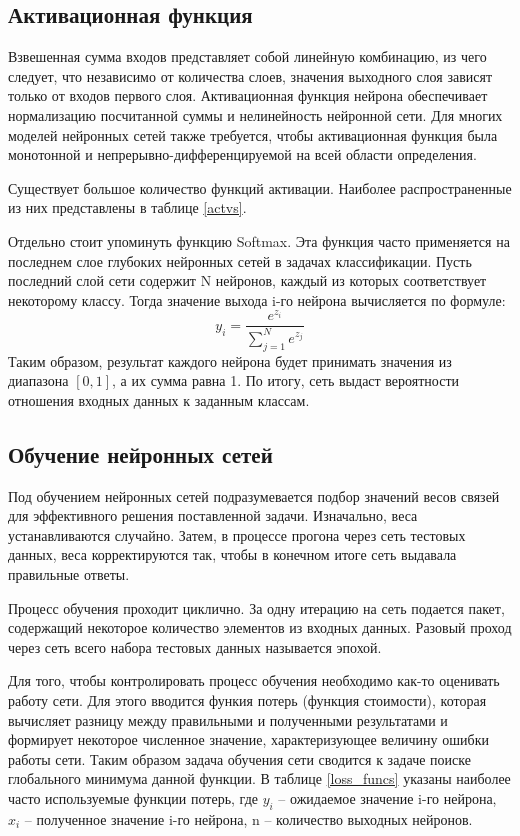 \subsection{Активационная функция}
\label{sec:activation}
Взвешенная сумма входов представляет собой линейную комбинацию, из чего следует, что независимо от количества слоев, значения выходного слоя зависят только от входов первого слоя. 
Активационная функция нейрона обеспечивает нормализацию посчитанной суммы и нелинейность нейронной сети. Для многих моделей нейронных сетей также требуется, чтобы активационная функция была монотонной и непрерывно-дифференцируемой на всей области определения.

Существует большое количество функций активации. Наиболее распространенные из них представлены в таблице \ref{actvs}.



Отдельно стоит упоминуть функцию Softmax. Эта функция часто применяется на последнем слое глубоких нейронных сетей в задачах классификации. Пусть последний слой сети содержит N нейронов, каждый из которых соответствует некоторому классу. Тогда значение выхода i-го нейрона вычисляется по формуле: 
\[
    y_i=\frac{e^{z_i}}{\sum\limits_{j=1}^{N}e^{z_j}}
\]
Таким образом, результат каждого нейрона будет принимать значения из диапазона $[0,1]$, а их сумма равна 1. По итогу, сеть выдаст вероятности отношения входных данных к заданным классам.
\clearpage
\subsection{Обучение нейронных сетей}
Под обучением нейронных сетей подразумевается подбор значений весов связей для эффективного решения поставленной задачи. Изначально, веса устанавливаются случайно. Затем, в процессе прогона через сеть тестовых данных, веса корректируются так, чтобы в конечном итоге сеть выдавала правильные ответы. 

Процесс обучения проходит циклично. За одну итерацию на сеть подается пакет, содержащий некоторое количество элементов из входных данных. Разовый проход через сеть всего набора тестовых данных называется эпохой.

Для того, чтобы контролировать процесс обучения необходимо как-то оценивать работу сети. Для этого вводится функия потерь (функция стоимости), которая вычисляет разницу между правильными и полученными результатами и формирует некоторое численное значение, характеризующее величину ошибки работы сети. Таким образом задача обучения сети сводится к задаче поиске глобального минимума данной функции. В таблице \ref{loss_funcs} указаны наиболее часто используемые функции потерь, где $y_i$ – ожидаемое значение i-го нейрона, $x_i$ – полученное значение i-го нейрона, n – количество выходных нейронов.

